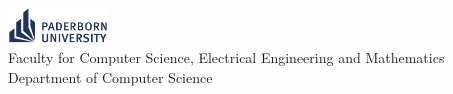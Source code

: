 \documentclass[13pt,t]{beamer}
\begin{document}
	\title[Graph Transformation with eMoflon::IBeX]{\Title}
	\subtitle{\ThesisType}
	\date{09.07.2018}
	\author{\Author}

	\begin{frame}
		\titlepage

		\begin{center}
			\includegraphics[width=100px]{../common/figures/university-logo-en}
			~ \\
			Faculty for Computer Science, Electrical Engineering and Mathematics \\
			Department of Computer Science \\
			\ResearchGroup
		\end{center}
	\end{frame}

	
	
	
	
\end{document}
